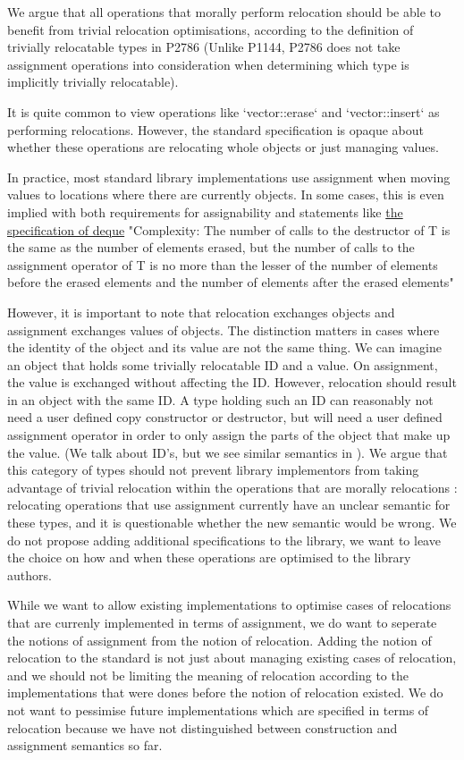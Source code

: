 \documentclass{wg21}
\begin{document}
We argue that all operations that morally perform relocation should be able to benefit from trivial relocation optimisations, according to the definition of trivially relocatable types in P2786 (Unlike P1144, P2786 does not take assignment operations into consideration when determining which type is implicitly trivially relocatable).

It is quite common to view operations like `vector::erase` and `vector::insert` as performing relocations. However, the standard specification is opaque about whether these operations are relocating whole objects or just managing values.

In practice, most standard library implementations use assignment when moving values to locations where there are currently objects.  In some cases, this is even implied with both requirements for assignability and statements like
\href{https://eel.is/c++draft/sequences#deque.modifiers-6}{the specification of deque}
"Complexity: The number of calls to the destructor of T is the same as the number of elements erased, but the number of calls to the assignment operator of T is no more than the lesser of the number of elements before the erased elements and the number of elements after the erased elements"

However, it is important to note that relocation exchanges objects and assignment exchanges values of objects. The distinction matters in cases where the identity of the object and its value are not the same thing. We can imagine an object that holds some trivially relocatable ID and a value. On assignment, the value is exchanged without affecting the ID. However, relocation should result in an object with the same ID. A type holding such an ID can reasonably not need a user defined copy constructor or destructor, but will need a user defined assignment operator in order to only assign the parts of the object that make up the value. (We talk about ID's, but we see similar semantics in ). We argue that this category of types should not prevent library implementors from taking advantage of trivial relocation within the operations that are morally relocations : relocating operations that use assignment currently have an unclear semantic for these types, and it is questionable whether the new semantic would be wrong. We do not propose adding additional specifications to the library, we want to leave the choice on how and when these operations are optimised to the library authors.


While we want to allow existing implementations to optimise cases of relocations that are currenly implemented in terms of assignment, we do want to seperate the notions of assignment from the notion of relocation. Adding the notion of relocation to the standard is not just about managing existing cases of relocation, and we should not be limiting the meaning of relocation according to the implementations that were dones before the notion of relocation existed. We do not want to pessimise future implementations which are specified in terms of relocation because we have not distinguished between construction and assignment semantics so far.
\end{document}
